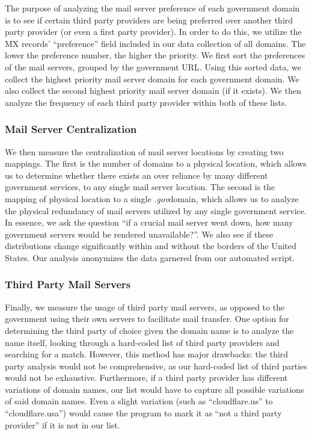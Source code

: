 \documentclass{hotnets21}
\newcommand{\dotgov}{\textit{.gov}\space}
\begin{document}
The purpose of analyzing the mail server preference of each government domain is to see if certain third party providers are being preferred over another third party provider (or even a first party provider).
In order to do this, we utilize the MX records’ “preference” field included in our data collection of all domains.
The lower the preference number, the higher the priority.
We first sort the preferences of the mail servers, grouped by the government URL.
Using this sorted data, we collect the highest priority mail server domain for each government domain.
We also collect the second highest priority mail server domain (if it exists).
We then analyze the frequency of each third party provider within both of these lists.

\subsubsection{Mail Server Centralization}

We then measure the centralization of mail server locations by creating two mappings.
The first is the number of domains to a physical location, which allows us to determine whether there exists an over reliance by many different government services, to any single mail server location.
The second is the mapping of physical location to a single \dotgov domain, which allows us to analyze the physical redundancy of mail servers utilized by any single government service.
In essence, we ask the question “if a crucial mail server went down, how many government servers would be rendered unavailable?”.
We also see if these distributions change significantly within and without the borders of the United States.
Our analysis anonymizes the data garnered from our automated script. 

\subsubsection{Third Party Mail Servers}

Finally, we measure the usage of third party mail servers, as opposed to the government using their own servers to facilitate mail transfer.
One option for determining the third party of choice given the domain name is to analyze the name itself, looking through a hard-coded list of third party providers and searching for a match.
However, this method has major drawbacks: the third party analysis would not be comprehensive, as our hard-coded list of third parties would not be exhaustive.
Furthermore, if a third party provider has different variations of domain names, our list would have to capture all possible variations of said domain names.
Even a slight variation (such as “cloudflare.us” to “cloudflare.usa”) would cause the program to mark it as “not a third party provider” if it is not in our list.
\end{document}

